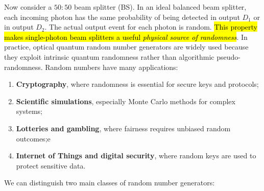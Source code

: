 Now consider a $50{:}50$ beam splitter (BS). In an ideal balanced beam splitter, each incoming photon has the same probability of being detected in output $D_1$ or in output $D_2$. The actual output event for each photon is random.
\hl{This property makes single-photon beam splitters a useful \emph{physical source of randomness}}. In practice, optical quantum random number generators are widely used because they exploit intrinsic quantum randomness rather than algorithmic pseudo-randomness.
Random numbers have many applications:
\begin{enumerate}
    \item \textbf{Cryptography}, where randomness is essential for secure keys and protocols;
    
    \item \textbf{Scientific simulations}, especially Monte Carlo methods for complex systems;
    
    \item \textbf{Lotteries and gambling}, where fairness requires unbiased random outcomes;e
    
    \item \textbf{Internet of Things and digital security}, where random keys are used to protect sensitive data.
\end{enumerate}
We can distinguish two main classes of random number generators:

